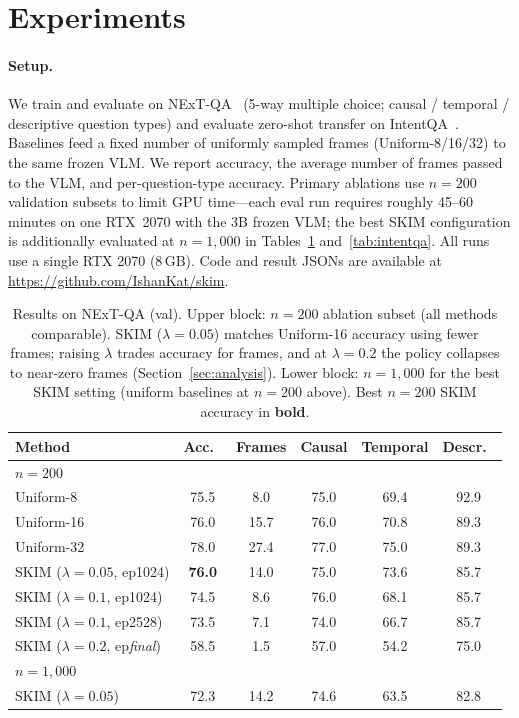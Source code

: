 \documentclass{article}
\begin{document}
\section{Experiments}
\label{sec:experiments}

\paragraph{Setup.}
We train and evaluate on NExT-QA~\citep{nextqa} (5-way multiple choice;
causal / temporal / descriptive question types) and evaluate zero-shot transfer
on IntentQA~\citep{intentqa}. Baselines feed a fixed number of uniformly sampled
frames (Uniform-8/16/32) to the same frozen VLM. We report accuracy, the average number of frames passed to the VLM, and
per-question-type accuracy. Primary ablations use $n{=}200$ validation subsets
to limit GPU time---each eval run requires roughly 45--60\,minutes on one
RTX~2070 with the 3B frozen VLM; the best SKIM configuration is additionally
evaluated at $n{=}1{,}000$ in Tables~\ref{tab:nextqa} and~\ref{tab:intentqa}.
All runs use a single RTX 2070 (8\,GB). Code and result JSONs are available at
\url{https://github.com/IshanKat/skim}.

\begin{table}[t]
  \caption{Results on NExT-QA (val). Upper block: $n{=}200$ ablation subset
    (all methods comparable). SKIM ($\lambda{=}0.05$) matches Uniform-16
    accuracy using fewer frames; raising $\lambda$ trades accuracy for frames,
    and at $\lambda{=}0.2$ the policy collapses to near-zero frames
    (Section~\ref{sec:analysis}). Lower block: $n{=}1{,}000$ for the best
    SKIM setting (uniform baselines at $n{=}200$ above). Best $n{=}200$ SKIM
    accuracy in \textbf{bold}.}
  \label{tab:nextqa}
  \centering
  \begin{tabular}{lccccc}
    \toprule
    Method & Acc.\ & Frames & Causal & Temporal & Descr.\ \\
    \midrule
    \multicolumn{6}{l}{\emph{$n{=}200$}} \\
    Uniform-8  & 75.5 & 8.0  & 75.0 & 69.4 & 92.9 \\
    Uniform-16 & 76.0 & 15.7 & 76.0 & 70.8 & 89.3 \\
    Uniform-32 & 78.0 & 27.4 & 77.0 & 75.0 & 89.3 \\
    \midrule
    SKIM ($\lambda{=}0.05$, ep1024)      & \textbf{76.0} & 14.0 & 75.0 & 73.6 & 85.7 \\
    SKIM ($\lambda{=}0.1$, ep1024)       & 74.5 & 8.6  & 76.0 & 68.1 & 85.7 \\
    SKIM ($\lambda{=}0.1$, ep2528)       & 73.5 & 7.1  & 74.0 & 66.7 & 85.7 \\
    SKIM ($\lambda{=}0.2$, ep\emph{final}) & 58.5 & 1.5  & 57.0 & 54.2 & 75.0 \\
    \midrule
    \multicolumn{6}{l}{\emph{$n{=}1{,}000$}} \\
    SKIM ($\lambda{=}0.05$) & 72.3 & 14.2 & 74.6 & 63.5 & 82.8 \\
    \bottomrule
  \end{tabular}
\end{table}
\end{document}
